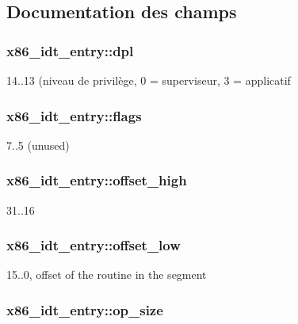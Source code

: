 \subsection{\-Documentation des champs}
\hypertarget{structx86__idt__entry_a5c0f7af9139df1e94d0c6d17dcd0fb66}{
\subsubsection[{dpl}]{ {\bf x86\-\_\-idt\-\_\-entry\-::dpl}}}\label{structx86__idt__entry_a5c0f7af9139df1e94d0c6d17dcd0fb66}
14..13 (niveau de privilège, 0 = superviseur, 3 = applicatif \hypertarget{structx86__idt__entry_af0ce23f490bcc54f41c3710ab6433786}{
\subsubsection[{flags}]{ {\bf x86\-\_\-idt\-\_\-entry\-::flags}}}\label{structx86__idt__entry_af0ce23f490bcc54f41c3710ab6433786}
7..5 (unused) \hypertarget{structx86__idt__entry_a0206c9a35f101b3cc450fce405df1c0e}{
\subsubsection[{offset\-\_\-high}]{ {\bf x86\-\_\-idt\-\_\-entry\-::offset\-\_\-high}}}\label{structx86__idt__entry_a0206c9a35f101b3cc450fce405df1c0e}
31..16 \hypertarget{structx86__idt__entry_a7efe04d7c37c746487da6d2ae5349525}{
\subsubsection[{offset\-\_\-low}]{ {\bf x86\-\_\-idt\-\_\-entry\-::offset\-\_\-low}}}\label{structx86__idt__entry_a7efe04d7c37c746487da6d2ae5349525}
15..0, offset of the routine in the segment \hypertarget{structx86__idt__entry_a58f211f10555adac756847fa46a0c856}{
\subsubsection[{op\-\_\-size}]{ {\bf x86\-\_\-idt\-\_\-entry\-::op\-\_\-size}}}\label{structx86__idt__entry_a58f211f10555adac756847fa46a0c856}
